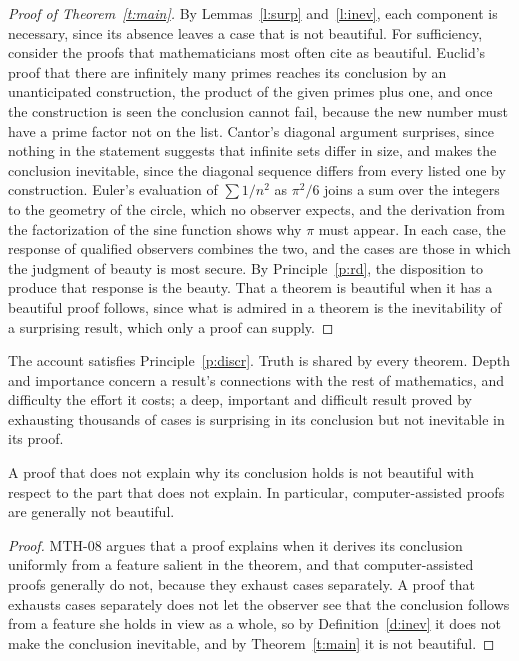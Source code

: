 \documentclass{situationist-preprint}
\begin{document}
\begin{proof}[Proof of Theorem~\ref{t:main}]
By Lemmas~\ref{l:surp} and~\ref{l:inev}, each component is necessary, since its absence leaves a case that is not beautiful. For sufficiency, consider the proofs that mathematicians most often cite as beautiful. Euclid's proof that there are infinitely many primes reaches its conclusion by an unanticipated construction, the product of the given primes plus one, and once the construction is seen the conclusion cannot fail, because the new number must have a prime factor not on the list. Cantor's diagonal argument surprises, since nothing in the statement suggests that infinite sets differ in size, and makes the conclusion inevitable, since the diagonal sequence differs from every listed one by construction. Euler's evaluation of $\sum 1/n^2$ as $\pi^2/6$ joins a sum over the integers to the geometry of the circle, which no observer expects, and the derivation from the factorization of the sine function shows why $\pi$ must appear. In each case, the response of qualified observers combines the two, and the cases are those in which the judgment of beauty is most secure. By Principle~\ref{p:rd}, the disposition to produce that response is the beauty. That a theorem is beautiful when it has a beautiful proof follows, since what is admired in a theorem is the inevitability of a surprising result, which only a proof can supply.
\end{proof}

The account satisfies Principle~\ref{p:discr}. Truth is shared by every theorem. Depth and importance concern a result's connections with the rest of mathematics, and difficulty the effort it costs; a deep, important and difficult result proved by exhausting thousands of cases is surprising in its conclusion but not inevitable in its proof.

\begin{corollary}\label{c:expl}
A proof that does not explain why its conclusion holds is not beautiful with respect to the part that does not explain. In particular, computer-assisted proofs are generally not beautiful.
\end{corollary}

\begin{proof}
MTH-08 argues that a proof explains when it derives its conclusion uniformly from a feature salient in the theorem, and that computer-assisted proofs generally do not, because they exhaust cases separately. A proof that exhausts cases separately does not let the observer see that the conclusion follows from a feature she holds in view as a whole, so by Definition~\ref{d:inev} it does not make the conclusion inevitable, and by Theorem~\ref{t:main} it is not beautiful.
\end{proof}
\end{document}
